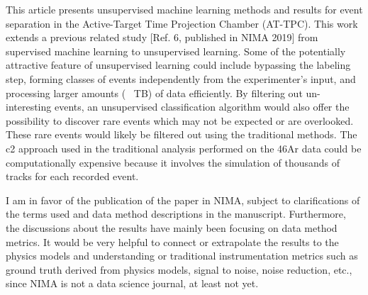 \documentclass[12pt]{article}
\begin{document}
This article presents unsupervised machine learning methods and results for event separation in
the Active-Target Time Projection Chamber (AT-TPC). This work extends a previous related
study [Ref. 6, published in NIMA 2019] from supervised machine learning to unsupervised
learning. Some of the potentially attractive feature of unsupervised learning could include
bypassing the labeling step, forming classes of events independently from the experimenter’s input,
and processing larger amounts (~ TB) of data efficiently. By filtering out un-interesting events, an
unsupervised classification algorithm would also offer the possibility to discover rare events which
may not be expected or are overlooked. These rare events would likely be filtered out using the
traditional methods. The c2 approach used in the traditional analysis performed on the 46Ar data
could be computationally expensive because it involves the simulation of thousands of tracks for
each recorded event.


I am in favor of the publication of the paper in NIMA, subject to clarifications of the terms used
and data method descriptions in the manuscript. Furthermore, the discussions about the results
have mainly been focusing on data method metrics. It would be very helpful to connect or
extrapolate the results to the physics models and understanding or traditional instrumentation
metrics such as ground truth derived from physics models, signal to noise, noise reduction, etc.,
since NIMA is not a data science journal, at least not yet.
\end{document}
